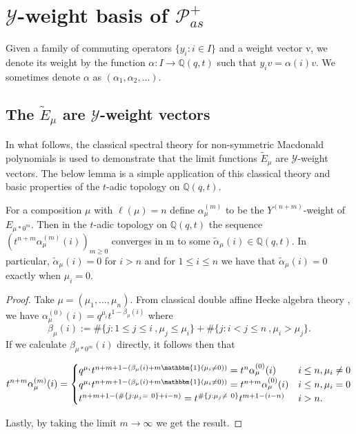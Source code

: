 \documentclass[ALCO,Unicode]{cedram}
\begin{document}
\section{\texorpdfstring{$\mathscr{Y}$}{Y}-weight basis of \texorpdfstring{$\mathscr{P}_{as}^{+}$}{P\_as+}}\label{weight basis section}

Given a family of commuting operators $\{ y_i : i \in I \}$ and a weight vector v, we denote its weight by the function $\alpha: I \rightarrow \mathbb{Q}(q,t)$ such that $y_iv = \alpha(i)v.$ We sometimes denote $\alpha$ as $(\alpha_1,\alpha_2,\ldots).$

\subsection{The \texorpdfstring{$\widetilde{E}_{\mu}$}{E\_mu} are \texorpdfstring{$\mathscr{Y}$}{Y}-weight vectors}

In what follows, the classical spectral theory for non-symmetric Macdonald polynomials is used to demonstrate that the limit functions $\widetilde{E}_{\mu}$ are $\mathscr{Y}$-weight vectors. The below lemma is a simple application of this classical theory and basic properties of the $t$-adic topology on $\mathbb{Q}(q,t)$.


\begin{lemm} \label{convergence of eigenvalues}
For a composition $\mu$ with $\ell(\mu) = n$ define $\alpha_{\mu}^{(m)}$ to be the $Y^{(n+m)}$-weight of $E_{\mu *0^m}$. Then in the $t$-adic topology on $\mathbb{Q}(q,t)$ the sequence $(t^{n+m}\alpha_{\mu}^{(m)}(i))_{m\geq 0}$ converges in m to some $\widetilde{\alpha}_{\mu}(i) \in \mathbb{Q}(q,t)$. In particular, $\widetilde{\alpha}_{\mu}(i) = 0$ for $i > n$ and for $1\leq i\leq n$ we have that $\widetilde{\alpha}_{\mu}(i) = 0$  exactly when $\mu_i = 0$.
\end{lemm}


\begin{proof}
Take $\mu = (\mu_1,\ldots,\mu_n)$. From classical double affine Hecke algebra theory \cite{C_2003},  we have $\alpha_{\mu}^{(0)}(i) = q^{\mu_i}t^{1-\beta_{\mu}(i)}$ where 
\begin{equation}\label{beta defn eq}
    \beta_{\mu}(i) := \#\{j: 1\leq j \leq i ~, \mu_j \leq \mu_i\} + \#\{j: i < j \leq n ~, \mu_i > \mu_j\}.
\end{equation}
If we calculate $\beta_{\mu*0^m}(i)$ directly, it follows then that

\[ t^{n+m}\alpha_{\mu}^{(m)}(i) = 
    \begin{cases}
    q^{\mu_i}t^{n+m+1-(\beta_{\mu}(i) + m \mathbbm{1}(\mu_i \neq 0))} = t^n\alpha_{\mu}^{(0)}(i) & i\leq n, \mu_i \neq 0\\
    q^{\mu_i}t^{n+m+1-(\beta_{\mu}(i) + m \mathbbm{1}(\mu_i \neq 0))} = t^{n+m}\alpha_{\mu}^{(0)}(i) & i\leq n, \mu_i = 0 \\
    t^{n+m+1-(\#\{j:\mu_{j} = ~0\} + i-n)} = t^{\#\{j:\mu_j \neq ~0\}}t^{m+1-(i-n)} & i > n .
     \end{cases}
\]

Lastly, by taking the limit $m\rightarrow \infty$ we get the result.
\end{proof}
\end{document}
